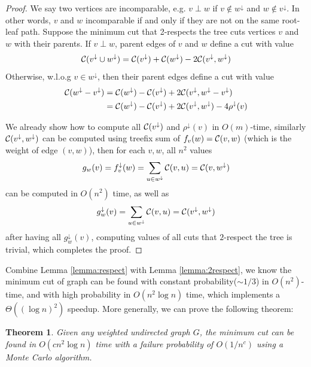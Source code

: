 \documentclass[12pt]{article}
\newcommand{\descendants}[1]{#1^\downarrow}
\newcommand{\cutval}[1]{{\cal C}(#1)}
\newcommand{\crossweight}[2]{{\cal C}(#1,#2)}
\theoremstyle{plain}
\newtheorem{theorem}{Theorem}[section]
\begin{document}
\begin{proof}
    We say two vertices are incomparable, e.g. $v\perp w$ if $v \notin \descendants{w}$ and $w \notin \descendants{v}$.  In other words, $v$ and $w$ incomparable if and only if they are not on the same root-leaf path. Suppose the minimum cut that 2-respects the tree cuts vertices $v$ and $w$ with their parents. If $v\perp w$, parent edges of $v$ and $w$ define a cut with value
    \begin{align*}
        \cutval{\descendants{v}\cup\descendants{w}} =\cutval{\descendants{v}}+\cutval{\descendants{w}} -2\crossweight{\descendants{v}}{\descendants{w}} 
    \end{align*}
    Otherwise, w.l.o.g $v \in \descendants{w}$, then their parent edges define a cut with value
    \begin{align*}
        \cutval{\descendants{w}-\descendants{v}}&=\cutval{\descendants{w}}-\cutval{\descendants{v}}+2\crossweight{\descendants{v}}{\descendants{w}-\descendants{v}}\\
        &=\cutval{\descendants{w}}-\cutval{\descendants{v}}+2\crossweight{\descendants{v}}{\descendants{w}}-4\descendants{\rho}(v)
    \end{align*}
    
    We already show how to compute all $\cutval{\descendants{v}}$ and $\descendants{\rho}(v)$ in $O(m)$-time, similarly $\crossweight{\descendants{v}}{\descendants{w}}$ can be computed using treefix sum of $f_v(w)=\crossweight{v}{w}$ (which is the weight of edge $(v,w)$), then for each $v,w$, all $n^2$ values
    \begin{align*}
        g_w(v)=\descendants{f_v}(w)=\sum_{u\in\descendants{w}}\crossweight{v}{u}=\crossweight{v}{\descendants{w}}
    \end{align*}
    can be computed in $O(n^2)$ time, as well as
    \begin{align*}
        \descendants{g_w}(v)=\sum_{u\in\descendants{w}}\crossweight{v}{u}=\crossweight{\descendants{v}}{\descendants{w}}
    \end{align*}
    after having all $\descendants{g_w}(v)$, computing values of all cuts that $2$-respect the tree is trivial, which completes the proof.
\end{proof}

Combine Lemma \ref{lemma:respect} with Lemma \ref{lemma:2respect}, we know the minimum cut of graph can be found with constant probability($\sim 1/3$) in $O(n^2)$-time, and with high probability in $O(n^2\log n)$ time, which implements a $\Theta((\log n)^2)$ speedup. More generally, we can prove the following theorem:
\begin{theorem}
    Given any weighted undirected graph $G$, the minimum cut can be found in $O(cn^2\log n)$ time with a failure probability of $O(1/n^c)$ using a Monte Carlo algorithm.
\end{theorem}
\end{document}
